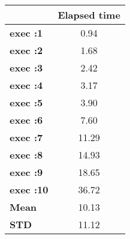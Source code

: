 \begin{tiny}\begin{tabular}{|l|c|}
\hline
&\textbf{Elapsed time}\\\hline
\textbf{exec :1}&0.94\\\hline
\textbf{exec :2}&1.68\\\hline
\textbf{exec :3}&2.42\\\hline
\textbf{exec :4}&3.17\\\hline
\textbf{exec :5}&3.90\\\hline
\textbf{exec :6}&7.60\\\hline
\textbf{exec :7}&11.29\\\hline
\textbf{exec :8}&14.93\\\hline
\textbf{exec :9}&18.65\\\hline
\textbf{exec :10}&36.72\\\hline
\textbf{ Mean}&10.13\\\hline
\textbf{ STD}&11.12\\\hline
\end{tabular}
\end{tiny}